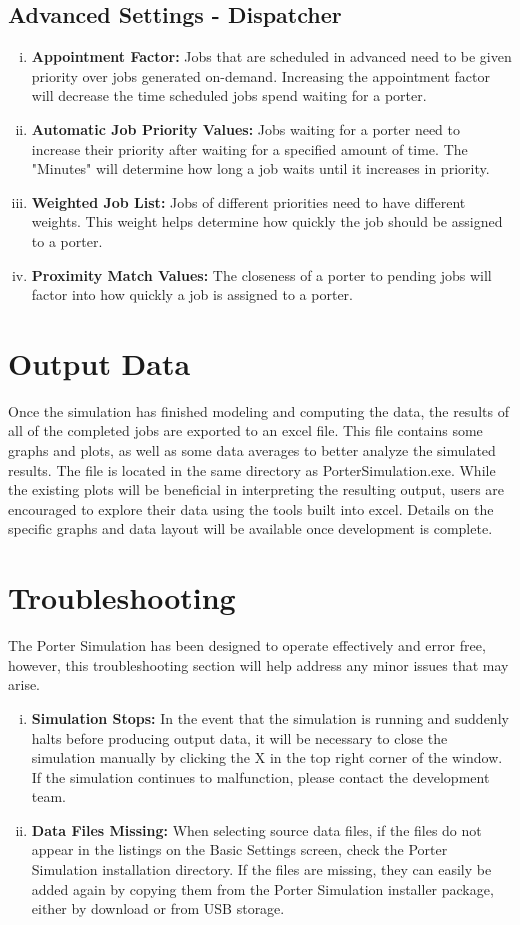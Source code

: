 \documentclass[paper=letter, fontsize=10pt]{scrartcl}
\numberwithin{equation}{section}		%
\numberwithin{figure}{section}			%
\numberwithin{table}{section}				%
\begin{document}
	\subsection{Advanced Settings - Dispatcher}
	\begin{enumerate}[(i)]
		\item \textbf{Appointment Factor:} Jobs that are scheduled in advanced need to be given priority over jobs generated on-demand.  Increasing the appointment factor will decrease the time scheduled jobs spend waiting for a porter.
		\item \textbf{Automatic Job Priority Values:} Jobs waiting for a porter need to increase their priority after waiting for a specified amount of time.  The "Minutes" will determine how long a job waits until it increases in priority.
		\item \textbf{Weighted Job List:} Jobs of different priorities need to have different weights.  This weight helps determine how quickly the job should be assigned to a porter.
		\item \textbf{Proximity Match Values:} The closeness of a porter to pending jobs will factor into how quickly a job is assigned to a porter.
	\end{enumerate}
	
\section{Output Data}
Once the simulation has finished modeling and computing the data, the results of all of the completed jobs are exported to an excel file. This file contains some graphs and plots, as well as some data averages to better analyze the simulated results. The file is located in the same directory as PorterSimulation.exe. While the existing plots will be beneficial in interpreting the resulting output, users are encouraged to explore their data using the tools built into excel. Details on the specific graphs and data layout will be available once development is complete.

\section{Troubleshooting}
The Porter Simulation has been designed to operate effectively and error free, however, this troubleshooting section will help address any minor issues that may arise.
\begin{enumerate}[(i)]
	\item \textbf{Simulation Stops:} In the event that the simulation is running and suddenly halts before producing output data, it will be necessary to close the simulation manually by clicking the X in the top right corner of the window. If the simulation continues to malfunction, please contact the development team.
	\item \textbf{Data Files Missing:} When selecting source data files, if the files do not appear in the listings on the Basic Settings screen, check the Porter Simulation installation directory. If the files are missing, they can easily be added again by copying them from the Porter Simulation installer package, either by download or from USB storage.
\end{enumerate}
\end{document}
